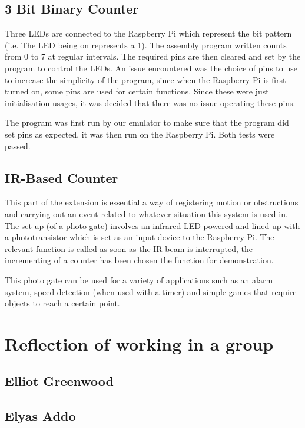 \documentclass[11pt]{article}
\begin{document}
\subsection{3 Bit Binary Counter}
 Three LEDs are connected to the Raspberry Pi which represent the bit pattern (i.e. The LED being on represents a 1). The assembly program written counts from 0 to 7 at regular intervals. The required pins are then cleared and set by the program to control the LEDs. An issue encountered was the choice of pins to use to increase the simplicity of the program, since when the Raspberry Pi is first turned on, some pins are used for certain functions. Since these were just initialisation usages, it was decided that there was no issue operating these pins.
 
 The program was first run by our emulator to make sure that the program did set pins as expected, it was then run on the Raspberry Pi. Both tests were passed. 

\subsection{IR-Based Counter}
This part of the extension is essential a way of registering motion or obstructions and carrying out an event related to whatever situation this system is used in. The set up (of a photo gate) involves an infrared LED powered and lined up with a phototransistor which is set as an input device to the Raspberry Pi. The relevant function is called as soon as the IR beam is interrupted, the incrementing of a counter has been chosen the function for demonstration.\newline

\noindent This photo gate can be used for a variety of applications such as an alarm system, speed detection (when used with a timer) and simple games that require objects to reach a certain point.\newline



\section{Reflection of working in a group}
\subsection{Elliot Greenwood}
\subsection{Elyas Addo}
\end{document}
